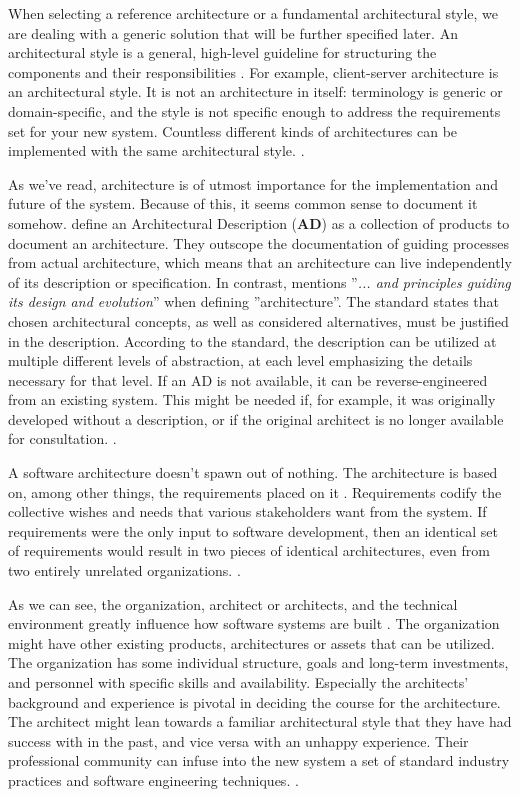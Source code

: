 \documentclass[utf8,english]{gradu3}
\begin{document}
When selecting a reference architecture or a fundamental architectural style, we
are dealing with a generic solution that will be further specified later. An
architectural style is a general, high-level guideline for structuring
the components and their responsibilities \parencite[24]{Bass1998}. For example,
client-server architecture is an architectural style. It is not an architecture
in itself: terminology is generic or domain-specific, and the style is not
specific enough to address the requirements set for your new system. Countless
different kinds of architectures can be implemented with the same architectural
style. \parencite[24]{Bass1998}.

As we've read, architecture is of utmost importance for the implementation and
future of the system. Because of this, it seems common sense to document it
somehow. \textcite[24]{Bass1998} define an Architectural Description
(\textbf{AD}) as a collection of products to document an architecture.
They outscope the documentation of
guiding processes from actual architecture, which means that an architecture
can live independently of its description or specification. In contrast,
\textcite[3]{IEEE42010} mentions ''\textit{... and principles guiding its design and
  evolution}'' when defining ''architecture''. The standard states that chosen architectural concepts, as well as
considered alternatives, must be justified in the description. According to
the standard, the description can be utilized at multiple different
levels of abstraction, at each level emphasizing the details necessary for that
level. If an AD is not available, it can be reverse-engineered from an existing
system. This might be needed if, for example, it was originally developed
without a description, or if the original architect is no longer available for
consultation. \parencite[7, 67]{IEEE42010}.

A software architecture doesn't spawn out of nothing. The architecture is based on,
among other things, the requirements placed on it \parencite{Bass1998}.
Requirements codify the collective wishes and needs that various stakeholders
want from the system. If requirements were the only input to software
development, then an identical set of requirements would result in two pieces of
identical architectures, even from two entirely unrelated organizations.
\parencite[5-9]{Bass1998}.

As we can see, the organization, architect or architects, and the technical
environment greatly influence how software systems are built
\parencite{Bass1998}. The organization might have other existing products,
architectures or assets that can be utilized. The organization has some
individual structure, goals and long-term investments, and personnel with
specific skills and availability. Especially the architects' background and
experience is pivotal in deciding the course for the architecture. The architect
might lean towards a familiar architectural style that they have had success with in
the past, and vice versa with an unhappy experience. Their professional
community can infuse into the new system a set of standard industry practices
and software engineering techniques. \parencite[5-9]{Bass1998}.
\end{document}
